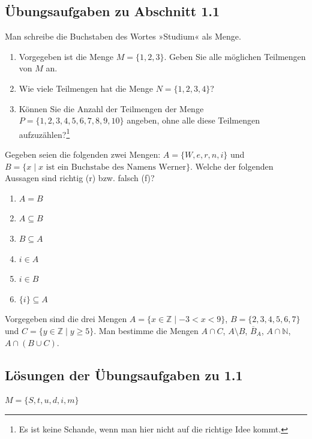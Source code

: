 \subsection{Übungsaufgaben zu Abschnitt 1.1}

\begin{uebungsaufgaben}
  \item Man schreibe die Buchstaben des Wortes »Studium« als Menge.
  \item \begin{enumerate}[label=\alph*)]
      \item Vorgegeben ist die Menge $M = \{1,2,3\}$. Geben Sie alle möglichen Teilmengen von $M$ an.
      \item Wie viele Teilmengen hat die Menge $N = \{1,2,3,4\}$?
      \item Können Sie die Anzahl der Teilmengen der Menge $P = \{1,2,3,4,5,6,7,8,9,10\}$ angeben, ohne alle diese Teilmengen aufzuzählen?\footnote{Es ist keine Schande, wenn man hier nicht auf die richtige Idee kommt.}
    \end{enumerate}
  \item Gegeben seien die folgenden zwei Mengen: $A = \{W, e, r, n, i\}$ und $B = \{x \mid x \text{ ist ein Buchstabe des Namens Werner}\}$. Welche der folgenden Aussagen sind richtig (r) bzw. falsch (f)?
    \begin{enumerate}[label=\alph*)]
      \item $A = B$
      \item $A \subseteq B$
      \item $B \subseteq A$
      \item $i \in A$
      \item $i \in B$
      \item $\{i\} \subseteq A$
    \end{enumerate}
  \item Vorgegeben sind die drei Mengen $A = \{x \in \mathbb{Z} \mid -3 < x < 9\}$, $B = \{2,3,4,5,6,7\}$ und $C = \{y \in \mathbb{Z} \mid y \geq 5\}$. Man bestimme die Mengen $A \cap C$, $A \setminus B$, $\overline{B}_A$, $A \cap \mathbb{N}$, $A \cap (B \cup C)$.
\end{uebungsaufgaben}

\subsection{Lösungen der Übungsaufgaben zu 1.1}

$M = \{S, t, u, d, i, m\}$

